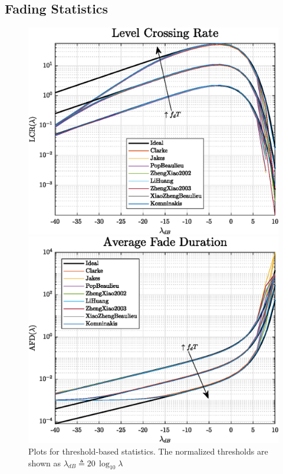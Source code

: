 \subsection{Fading Statistics}

\begin{figure}
	\hfill
	\begin{minipage}{.49\linewidth}
		\includegraphics[width=\linewidth]{img/multiLCR.eps}
	\end{minipage}
	\hfill
	\begin{minipage}{.49\linewidth}
		\includegraphics[width=\linewidth]{img/multiAFD.eps}
	\end{minipage}
	\hfill
	
	\caption{Plots for threshold-based statistics. The normalized thresholds are shown as  $\lambda_{dB} \triangleq 20\, \log_{10} \lambda$}
	\label{fig:LCR_AFD}
\end{figure}

